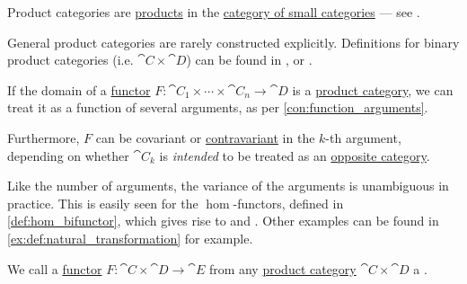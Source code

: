 \begin{comments}
  \item Product categories are \hyperref[def:categorical_product]{products} in the \hyperref[def:category_of_small_categories]{category of small categories} --- see .

  \item General product categories are rarely constructed explicitly. Definitions for binary product categories (i.e. \( \cat{C} \times \cat{D} \)) can be found in
  \cite[36]{MacLane1998CategoryTheory},
  \cite[def. 2.5.1]{Schubert1972Categories} or
  \cite[def. 1.3.49]{Perrone2024StartingCategoryTheory}.
\end{comments}

\begin{concept}\label{con:functor_argument_variance}\mimprovised
  If the domain of a \hyperref[def:functor]{functor} \( F: \cat{C}_1 \times \cdots \times \cat{C}_n \to \cat{D} \) is a \hyperref[def:product_category]{product category}, we can treat it as a function of several arguments, as per \cref{con:function_arguments}.

  Furthermore, \( F \) can be covariant or \hyperref[def:contravariant_functor]{contravariant} in the \( k \)-th argument, depending on whether \( \cat{C}_k \) is \emph{intended} to be treated as an \hyperref[def:opposite_category]{opposite category}.

  Like the number of arguments, the variance of the arguments is unambiguous in practice. This is easily seen for the \( \hom \)-functors, defined in \cref{def:hom_bifunctor}, which gives rise to  and . Other examples can be found in \cref{ex:def:natural_transformation} for example.
\end{concept}

\begin{definition}\label{def:bifunctor}
  We call a \hyperref[def:functor]{functor} \( F: \cat{C} \times \cat{D} \to \cat{E} \) from any \hyperref[def:product_category]{product category} \( \cat{C} \times \cat{D} \) a .
\end{definition}

